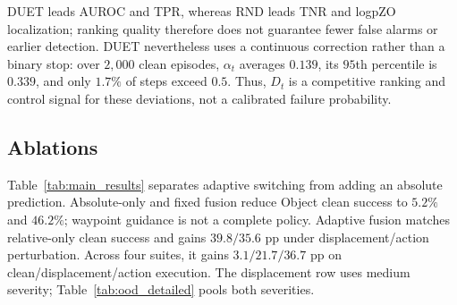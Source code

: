 \documentclass[letterpaper, 10 pt, conference]{ieeeconf}
\begin{document}
\begin{table}[t]
\caption{Matched-protocol failure-risk scoring. Higher is better; column bests in bold.}
\label{tab:detection}
\centering
{}
\end{table}

DUET leads AUROC and TPR, whereas RND leads TNR and logpZO localization; ranking quality therefore does not guarantee fewer false alarms or earlier detection. DUET nevertheless uses a continuous correction rather than a binary stop: over $2{,}000$ clean episodes, $\alpha_t$ averages $0.139$, its $95$th percentile is $0.339$, and only $1.7\%$ of steps exceed $0.5$. Thus, $D_t$ is a competitive ranking and control signal for these deviations, not a calibrated failure probability.

\subsection{Ablations}
\label{sec:ablations}
Table~\ref{tab:main_results} separates adaptive switching from adding an absolute prediction. Absolute-only and fixed fusion reduce Object clean success to $5.2\%$ and $46.2\%$; waypoint guidance is not a complete policy. Adaptive fusion matches relative-only clean success and gains $39.8/35.6$ pp under displacement/action perturbation. Across four suites, it gains $3.1/21.7/36.7$ pp on clean/displacement/action execution. The displacement row uses medium severity; Table~\ref{tab:ood_detailed} pools both severities.
\end{document}
